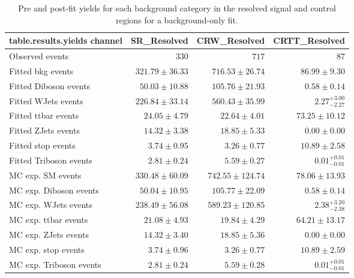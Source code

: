 \begin{table}
\centering
\small
\begin{tabular*}{\textwidth}{@{\extracolsep{\fill}}lrrr}
\toprule
\textbf{table.results.yields channel}           & SR\_Resolved            & CRW\_Resolved            & CRTT\_Resolved              \\
\midrule
Observed events          & $330$              & $717$              & $87$                    \\
\midrule
Fitted bkg events         & $321.79 \pm 36.33$          & $716.53 \pm 26.74$          & $86.99 \pm 9.30$              \\
\midrule
        Fitted Diboson events         & $50.03 \pm 10.88$          & $105.76 \pm 21.93$          & $0.58 \pm 0.14$              \\
        Fitted WJets events         & $226.84 \pm 33.14$          & $560.43 \pm 35.99$          & $2.27_{-2.27}^{+3.00}$              \\
        Fitted ttbar events         & $24.05 \pm 4.79$          & $22.64 \pm 4.01$          & $73.25 \pm 10.12$              \\
        Fitted ZJets events         & $14.32 \pm 3.38$          & $18.85 \pm 5.33$          & $0.00 \pm 0.00$              \\
        Fitted stop events         & $3.74 \pm 0.95$          & $3.26 \pm 0.77$          & $10.89 \pm 2.58$              \\
        Fitted Triboson events         & $2.81 \pm 0.24$          & $5.59 \pm 0.27$          & $0.01_{-0.01}^{+0.01}$              \\
 \midrule
MC exp. SM events              & $330.48 \pm 60.09$          & $742.55 \pm 124.74$          & $78.06 \pm 13.93$              \\
\midrule
        MC exp. Diboson events         & $50.04 \pm 10.95$          & $105.77 \pm 22.09$          & $0.58 \pm 0.14$              \\
        MC exp. WJets events         & $238.49 \pm 56.08$          & $589.23 \pm 120.85$          & $2.38_{-2.38}^{+3.20}$              \\
        MC exp. ttbar events         & $21.08 \pm 4.93$          & $19.84 \pm 4.29$          & $64.21 \pm 13.17$              \\
        MC exp. ZJets events         & $14.32 \pm 3.40$          & $18.85 \pm 5.36$          & $0.00 \pm 0.00$              \\
        MC exp. stop events         & $3.74 \pm 0.96$          & $3.26 \pm 0.77$          & $10.89 \pm 2.59$              \\
        MC exp. Triboson events         & $2.81 \pm 0.24$          & $5.59 \pm 0.28$          & $0.01_{-0.01}^{+0.01}$              \\
\bottomrule
\end{tabular*}
\caption{Pre and post-fit yields for each background category in the resolved signal and control regions for a background-only fit.}
\label{tab:yields_res}
\end{table}

